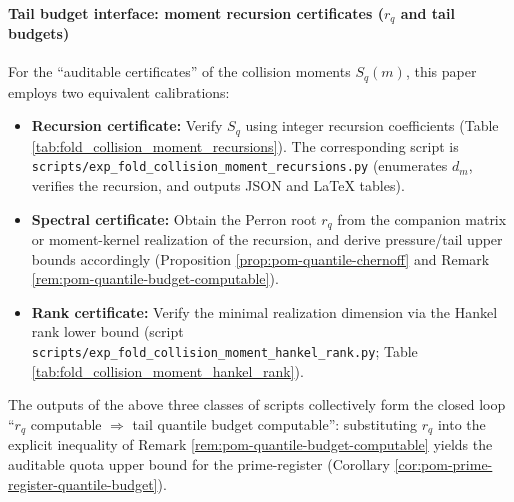 \paragraph{Tail budget interface: moment recursion certificates (\texorpdfstring{$r_q$}{rq} and tail budgets)}
For the ``auditable certificates'' of the collision moments \(S_q(m)\), this paper employs two equivalent calibrations:
\begin{itemize}
  \item \textbf{Recursion certificate:} Verify \(S_q\) using integer recursion coefficients (Table \ref{tab:fold_collision_moment_recursions}).
  The corresponding script is \texttt{scripts/exp\_fold\_collision\_moment\_recursions.py} (enumerates \(d_m\), verifies the recursion, and outputs JSON and LaTeX tables).
  \item \textbf{Spectral certificate:} Obtain the Perron root \(r_q\) from the companion matrix or moment-kernel realization of the recursion, and derive pressure/tail upper bounds accordingly (Proposition \ref{prop:pom-quantile-chernoff} and Remark \ref{rem:pom-quantile-budget-computable}).
  \item \textbf{Rank certificate:} Verify the minimal realization dimension via the Hankel rank lower bound (script \texttt{scripts/exp\_fold\_collision\_moment\_hankel\_rank.py}; Table \ref{tab:fold_collision_moment_hankel_rank}).
  \end{itemize}

The outputs of the above three classes of scripts collectively form the closed loop ``\(r_q\) computable \(\Rightarrow\) tail quantile budget computable'': substituting \(r_q\) into the explicit inequality of Remark \ref{rem:pom-quantile-budget-computable} yields the auditable quota upper bound for the prime-register (Corollary \ref{cor:pom-prime-register-quantile-budget}).

